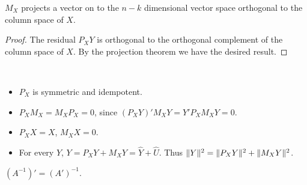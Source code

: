 \documentclass[letterpaper, 10pt]{article}
\begin{document}
\begin{proposition}
  \(M_X\) projects a vector on to the \(n - k\) dimensional vector space orthogonal to the column space of \(X\).
\end{proposition}
\begin{proof}
  The residual \(P_X Y\) is orthogonal to the orthogonal complement of the column space of \(X\).
  By the projection theorem we have the desired result.
\end{proof}

\begin{proposition}~
  \begin{itemize}
    \item \(P_X\) is symmetric and idempotent.
    \item \(P_X M_X = M_X P_X = 0\), since \((P_X Y)' M_X Y = Y' P_X M_X Y = 0\).
    \item \(P_X X = X\), \(M_X X = 0\). 
    \item For every \(Y\), \(Y = P_X Y + M_X Y = \hat{Y} + \hat{U}\).
      Thus \(\lVert Y\rVert^2 = \lVert P_X Y\rVert^2 + \lVert M_X Y\rVert^2\).
  \end{itemize}
\end{proposition}
\begin{remark}
  \((A^{-1})' = (A')^{-1}\).
\end{remark}
\end{document}
